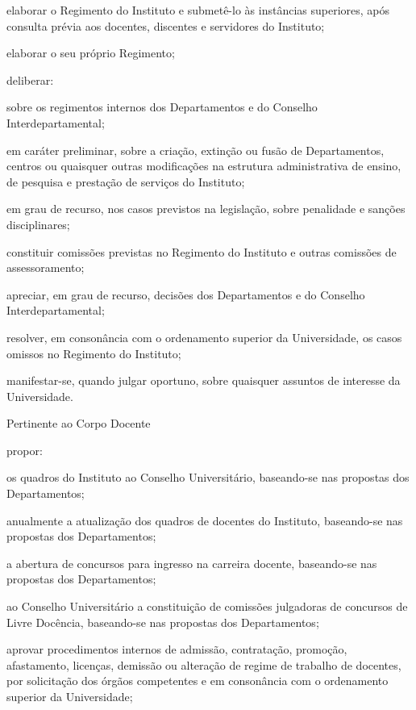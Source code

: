 \documentclass{documento}
\begin{document}
\subinciso elaborar o Regimento do Instituto e submetê-lo às instâncias superiores, após consulta prévia aos docentes, discentes e servidores do Instituto;

\subinciso elaborar o seu próprio Regimento;
    
\subinciso deliberar:

\subsubinciso sobre os regimentos internos dos Departamentos e do Conselho Interdepartamental;
        
\subsubinciso em caráter preliminar, sobre a criação, extinção ou fusão de Departamentos, centros ou quaisquer outras modificações na estrutura administrativa de ensino, de pesquisa e prestação de serviços do Instituto;
        
\subsubinciso em grau de recurso, nos casos previstos na legislação, sobre penalidade e sanções disciplinares;
    
\subinciso constituir comissões previstas no Regimento do Instituto e outras comissões de assessoramento;
    
\subinciso apreciar, em grau de recurso, decisões dos Departamentos e do Conselho Interdepartamental;
    
\subinciso resolver, em consonância com o ordenamento superior da Universidade, os casos omissos no Regimento do Instituto;
    
\subinciso manifestar-se, quando julgar oportuno, sobre quaisquer assuntos de interesse da Universidade.

\inciso Pertinente ao Corpo Docente

\subinciso propor:

\subsubinciso os quadros do Instituto ao Conselho Universitário, baseando-se nas propostas dos Departamentos;

\subsubinciso anualmente a atualização dos quadros de docentes do Instituto, baseando-se nas propostas dos Departamentos;

\subsubinciso a abertura de concursos para ingresso na carreira docente, baseando-se nas propostas dos Departamentos;

\subsubinciso ao Conselho Universitário a constituição de comissões julgadoras de concursos de Livre Docência, baseando-se nas propostas dos Departamentos;

\subinciso aprovar procedimentos internos de admissão, contratação, promoção, afastamento, licenças, demissão ou alteração de regime de trabalho de docentes, por solicitação dos órgãos competentes e em consonância com o ordenamento superior da Universidade;
\end{document}
